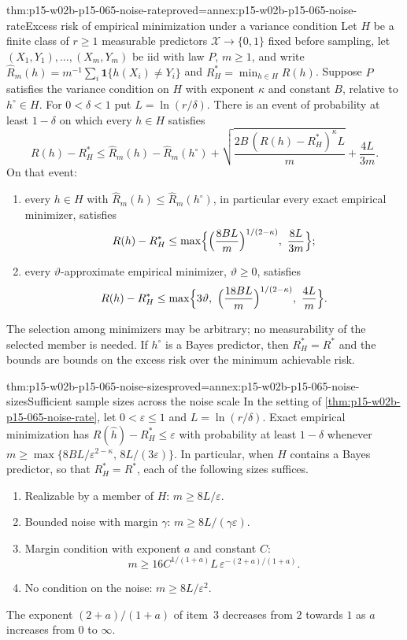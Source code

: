 \begin{hbtheorem}{thm:p15-w02b-p15-065-noise-rate}{proved=annex:p15-w02b-p15-065-noise-rate}{Excess risk of empirical minimization under a variance condition}
Let \(H\) be a finite class of \(r\geq1\) measurable predictors
\(\mathcal X\to\{0,1\}\) fixed before sampling, let \((X_1,Y_1),\ldots,(X_m,Y_m)\)
be iid with law \(P\), \(m\geq1\), and write
\(\widehat R_m(h)=m^{-1}\sum_i\mathbf1\{h(X_i)\ne Y_i\}\) and
\(R_H^{*}=\min_{h\in H}R(h)\). Suppose \(P\) satisfies the variance
condition on \(H\) with exponent \(\kappa\) and constant \(B\), relative to
\(h^{\circ}\in H\). For \(0<\delta<1\) put \(L=\ln(r/\delta)\). There is an
event of probability at least \(1-\delta\) on which every \(h\in H\)
satisfies
\[
 R(h)-R_H^{*}\leq\widehat R_m(h)-\widehat R_m(h^{\circ})
 +\sqrt{\frac{2B\,(R(h)-R_H^{*})^{\kappa}L}{m}}+\frac{4L}{3m}.
\]
On that event:
\begin{enumerate}
\item every \(h\in H\) with \(\widehat R_m(h)\leq\widehat R_m(h^{\circ})\),
      in particular every exact empirical minimizer, satisfies
      \[
       R(h)-R_H^{*}\leq\max\Bigl\{\Bigl(\frac{8BL}{m}\Bigr)^{1/(2-\kappa)},\
       \frac{8L}{3m}\Bigr\};
      \]
\item every \(\vartheta\)-approximate empirical minimizer,
      \(\vartheta\geq0\), satisfies
      \[
       R(h)-R_H^{*}\leq\max\Bigl\{3\vartheta,\
       \Bigl(\frac{18BL}{m}\Bigr)^{1/(2-\kappa)},\ \frac{4L}{m}\Bigr\}.
      \]
\end{enumerate}
The selection among minimizers may be arbitrary; no measurability of the
selected member is needed. If \(h^{\circ}\) is a Bayes predictor, then
\(R_H^{*}=R^{*}\) and the bounds are bounds on the excess risk over the
minimum achievable risk.
\end{hbtheorem}

\begin{hbcorollary}{thm:p15-w02b-p15-065-noise-sizes}{proved=annex:p15-w02b-p15-065-noise-sizes}{Sufficient sample sizes across the noise scale}
In the setting of \cref{thm:p15-w02b-p15-065-noise-rate}, let
\(0<\varepsilon\leq1\) and \(L=\ln(r/\delta)\). Exact empirical
minimization has \(R(\widehat h)-R_H^{*}\leq\varepsilon\) with probability
at least \(1-\delta\) whenever
\(m\geq\max\{8BL/\varepsilon^{2-\kappa},\,8L/(3\varepsilon)\}\). In
particular, when \(H\) contains a Bayes predictor, so that
\(R_H^{*}=R^{*}\), each of the following sizes suffices.
\begin{enumerate}
\item Realizable by a member of \(H\): \(m\geq8L/\varepsilon\).
\item Bounded noise with margin \(\gamma\):
      \(m\geq8L/(\gamma\varepsilon)\).
\item Margin condition with exponent \(a\) and constant \(C\):
      \[
       m\geq16C^{1/(1+a)}L\,\varepsilon^{-(2+a)/(1+a)}.
      \]
\item No condition on the noise: \(m\geq8L/\varepsilon^2\).
\end{enumerate}
The exponent \((2+a)/(1+a)\) of item~3 decreases from \(2\) towards \(1\)
as \(a\) increases from \(0\) to \(\infty\).
\end{hbcorollary}

